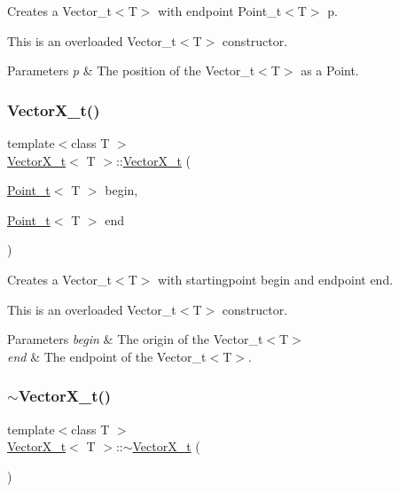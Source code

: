 Creates a Vector\+\_\+t$<$\+T$>$ with endpoint Point\+\_\+t$<$\+T$>$ p. 

This is an overloaded Vector\+\_\+t$<$\+T$>$ constructor.


\begin{DoxyParams}{Parameters}
{\em p} & The position of the Vector\+\_\+t$<$\+T$>$ as a Point. \\
\hline
\end{DoxyParams}
\mbox{\label{class_vector_x__t_a8ac4f12ebd7673a4b3b7cf86e842c912}} 
\subsubsection{\texorpdfstring{Vector\+X\+\_\+t()}{VectorX\_t()}\hspace{0.1cm}{\footnotesize\ttfamily [5/5]}}
{\footnotesize\ttfamily template$<$class T $>$ \\
\hyperlink{class_vector_x__t}{Vector\+X\+\_\+t}$<$ T $>$\+::\hyperlink{class_vector_x__t}{Vector\+X\+\_\+t} (\begin{DoxyParamCaption}\item[{\hyperlink{class_point__t}{Point\+\_\+t}$<$ T $>$}]{begin,  }\item[{\hyperlink{class_point__t}{Point\+\_\+t}$<$ T $>$}]{end }\end{DoxyParamCaption})}



Creates a Vector\+\_\+t$<$\+T$>$ with startingpoint begin and endpoint end. 

This is an overloaded Vector\+\_\+t$<$\+T$>$ constructor.


\begin{DoxyParams}{Parameters}
{\em begin} & The origin of the Vector\+\_\+t$<$\+T$>$ \\
\hline
{\em end} & The endpoint of the Vector\+\_\+t$<$\+T$>$. \\
\hline
\end{DoxyParams}
\mbox{\label{class_vector_x__t_a91e541bc8a28a206c0caaefee09c4fdc}} 
\subsubsection{\texorpdfstring{$\sim$\+Vector\+X\+\_\+t()}{~VectorX\_t()}}
{\footnotesize\ttfamily template$<$class T $>$ \\
\hyperlink{class_vector_x__t}{Vector\+X\+\_\+t}$<$ T $>$\+::$\sim$\hyperlink{class_vector_x__t}{Vector\+X\+\_\+t} (\begin{DoxyParamCaption}{ }\end{DoxyParamCaption})\hspace{0.3cm}{\ttfamily [virtual]}}



